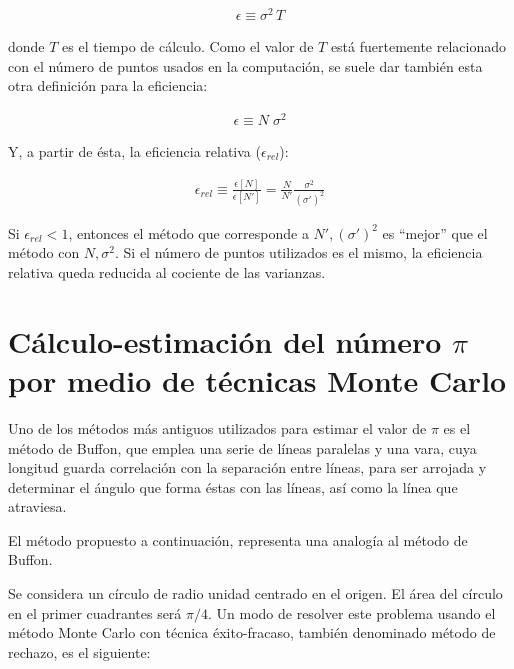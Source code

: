\begin{eqnarray}
 	\epsilon \equiv \sigma ^{2} \, T
 \label{EqZZZ9} 
\end{eqnarray}


donde $T$ es el tiempo de c\'alculo.
%
Como el valor de $T$ est\'a fuertemente relacionado con el n\'umero de puntos usados en la computaci\'on, se suele dar tambi\'en esta otra
definici\'on para la eficiencia:

\begin{eqnarray}
 	\epsilon \equiv N \; \sigma ^{2} 
 \label{EqZZZ10} 
\end{eqnarray}

Y, a partir de \'esta, la eficiencia relativa ($\epsilon_{rel}$):


\begin{eqnarray}
 	\epsilon_{rel} \equiv \frac{\epsilon [N]}{\epsilon [N']} = \frac{N}{N'} \frac{\sigma ^{2}}{(\sigma') ^{2}} 
 \label{EqZZZ11} 
\end{eqnarray}


Si $\epsilon_{rel} < 1$, entonces el m\'etodo que corresponde a $N', (\sigma') ^{2}$ es 
``mejor'' que el m\'etodo con $N, \sigma ^{2}$.
%
Si el n\'umero de puntos utilizados es el mismo, la eficiencia relativa queda reducida al cociente de las varianzas.



\section{C\'alculo-estimaci\'on del n\'umero $\pi$ por medio de t\'ecnicas Monte Carlo}
\label{CapVII_3}

Uno de los m\'etodos m\'as antiguos utilizados para estimar el valor de $\pi$ es el m\'etodo de Buffon, que emplea una serie de l\'ineas 
paralelas y una vara, cuya longitud guarda correlaci\'on con la separaci\'on entre l\'ineas, para ser arrojada y determinar el \'angulo 
que forma \'estas con las l\'ineas, as\'i como la l\'inea que atraviesa.
%

El m\'etodo propuesto a continuaci\'on, representa una analog\'ia al m\'etodo de Buffon.
%

Se considera un c\'irculo de radio unidad centrado en el origen. El \'area del c\'irculo en el primer cuadrantes ser\'a $\pi/4$.
%
Un modo de resolver este problema usando el m\'etodo Monte Carlo con t\'ecnica \'exito-fracaso, tambi\'en denominado m\'etodo de rechazo,
es el siguiente:

